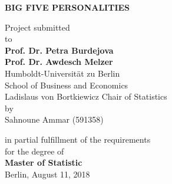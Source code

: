 



\begin{center}

    {\Large{\bf BIG FIVE PERSONALITIES}} \vspace{0.5cm}


    {\normalsize Project submitted \\\vspace{0.5cm}
    to}\\\vspace{0.5cm}
    {\normalsize{\bf Prof. Dr. Petra Burdejova}} \\\vspace{0.5cm}
    {\normalsize{\bf Prof. Dr. Awdesch Melzer}} \\\vspace{0.5cm}
    {\normalsize Humboldt-Universit\"at zu Berlin \\
    School of Business and Economics \\
   Ladislaus von Bortkiewicz Chair of Statistics}\\


    {\normalsize by \\\vspace{0.5cm}
     Sahnoune Ammar
    (591358)} \vspace{1cm}


    {\normalsize in partial fulfillment of the requirements \\
    for the degree of \\
    {\bf Master of Statistic} \\
    Berlin, August 11, 2018}

\end{center}

